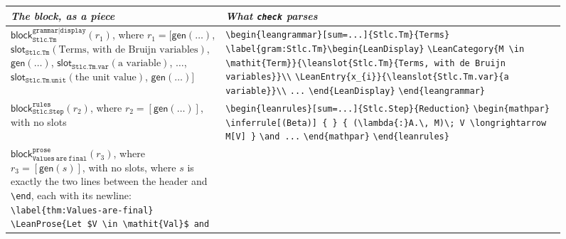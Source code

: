 \documentclass[acmsmall,screen,review,anonymous,nonacm]{acmart}
\begin{document}
\begin{figure}[t]
\footnotesize
\newcommand{\cs}[1]{\textbackslash{}#1}
\begin{tabular}{@{}p{.38\linewidth}@{\quad}p{.58\linewidth}@{}}
\textit{The block, as a piece} & \textit{What \texttt{check} parses}\tabularnewline
\hline\noalign{\smallskip}
\raggedright $\mathsf{block}_{\mathtt{Stlc.Tm}}^{\mathtt{grammar|display}}(r_{1})$, where
$r_{1} = [\mathsf{gen}(\ldots)$,
$\mathsf{slot}_{\mathtt{Stlc.Tm}}(\text{Terms, with de Bruijn variables})$,
$\mathsf{gen}(\ldots)$,
$\mathsf{slot}_{\mathtt{Stlc.Tm.var}}(\text{a variable})$, $\ldots$,
$\mathsf{slot}_{\mathtt{Stlc.Tm.unit}}(\text{the unit value})$,
$\mathsf{gen}(\ldots)]$
&
\raggedright\texttt{\cs{begin}\{leangrammar\}[sum=...]\{Stlc.Tm\}\{Terms\}}\newline
\texttt{\cs{label}\{gram:Stlc.Tm\}\cs{begin}\{LeanDisplay\}}\newline
\texttt{\cs{LeanCategory}\{M \cs{in} \cs{mathit}\{Term\}\}\{\cs{leanslot}\{Stlc.Tm\}\{Terms, with de Bruijn variables\}\}\cs{}\cs{}}\newline
\texttt{\cs{LeanEntry}\{x\_\{i\}\}\{\cs{leanslot}\{Stlc.Tm.var\}\{a variable\}\}\cs{}\cs{}}\newline
\texttt{...}\newline
\texttt{\cs{end}\{LeanDisplay\}}\newline
\texttt{\cs{end}\{leangrammar\}}
\tabularnewline\noalign{\medskip}
\raggedright $\mathsf{block}_{\mathtt{Stlc.Step}}^{\mathtt{rules}}(r_{2})$, where
$r_{2} = [\mathsf{gen}(\ldots)]$, with no slots
&
\raggedright\texttt{\cs{begin}\{leanrules\}[sum=...]\{Stlc.Step\}\{Reduction\}}\newline
\texttt{\cs{begin}\{mathpar\}}\newline
\texttt{\cs{inferrule}[(Beta)] \{ \} \{ (\cs{lambda}\{:\}A.\cs{,} M)\cs{;} V \cs{longrightarrow} M[V] \}}\newline
\texttt{\cs{and} ...}\newline
\texttt{\cs{end}\{mathpar\}}\newline
\texttt{\cs{end}\{leanrules\}}
\tabularnewline\noalign{\medskip}
\raggedright $\mathsf{block}_{\mathtt{Values\ are\ final}}^{\mathtt{prose}}(r_{3})$, where
$r_{3} = [\mathsf{gen}(s)]$, with no slots, where $s$ is
exactly the two lines between the header and \texttt{\cs{end}}, each with
its newline:\newline
\texttt{\cs{label}\{thm:Values-are-final\}}\newline
\texttt{\cs{LeanProse}\{Let \$V \cs{in} \cs{mathit}\{Val\}\$ and
}
\end{tabular}
\end{figure}
\end{document}
